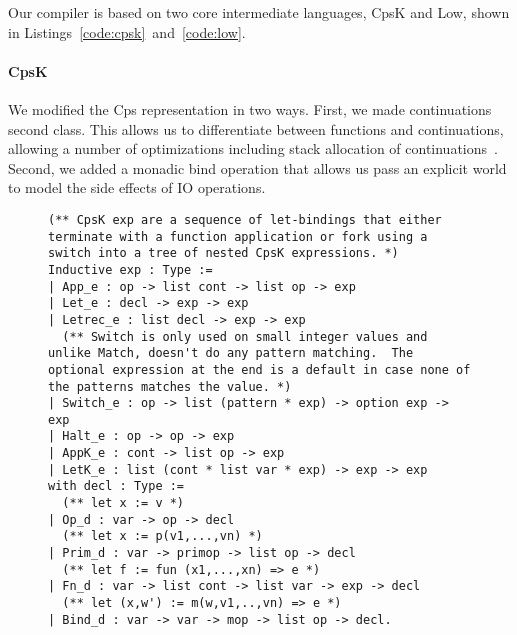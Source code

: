 \documentclass{article}
\begin{document}
Our compiler is based on two core intermediate languages, CpsK and Low, shown in Listings~\ref{code:cpsk}~and~\ref{code:low}.

\paragraph{CpsK} We modified the Cps representation in two ways. First, we made continuations second class. This allows us to differentiate between functions and continuations, allowing a number of optimizations including stack allocation of continuations~\cite{kennedy07cps}. Second, we added a monadic bind operation that allows us pass an explicit world to model the side effects of IO operations.

\begin{figure}
\begin{lstlisting}
(** CpsK exp are a sequence of let-bindings that either terminate with a function application or fork using a switch into a tree of nested CpsK expressions. *)
Inductive exp : Type := 
| App_e : op -> list cont -> list op -> exp
| Let_e : decl -> exp -> exp
| Letrec_e : list decl -> exp -> exp
  (** Switch is only used on small integer values and unlike Match, doesn't do any pattern matching.  The optional expression at the end is a default in case none of the patterns matches the value. *)
| Switch_e : op -> list (pattern * exp) -> option exp -> exp
| Halt_e : op -> op -> exp
| AppK_e : cont -> list op -> exp
| LetK_e : list (cont * list var * exp) -> exp -> exp
with decl : Type := 
  (** let x := v *)
| Op_d : var -> op -> decl
  (** let x := p(v1,...,vn) *)
| Prim_d : var -> primop -> list op -> decl
  (** let f := fun (x1,...,xn) => e *)
| Fn_d : var -> list cont -> list var -> exp -> decl
  (** let (x,w') := m(w,v1,..,vn) => e *)
| Bind_d : var -> var -> mop -> list op -> decl.
\end{lstlisting}
\end{figure}
\end{document}

